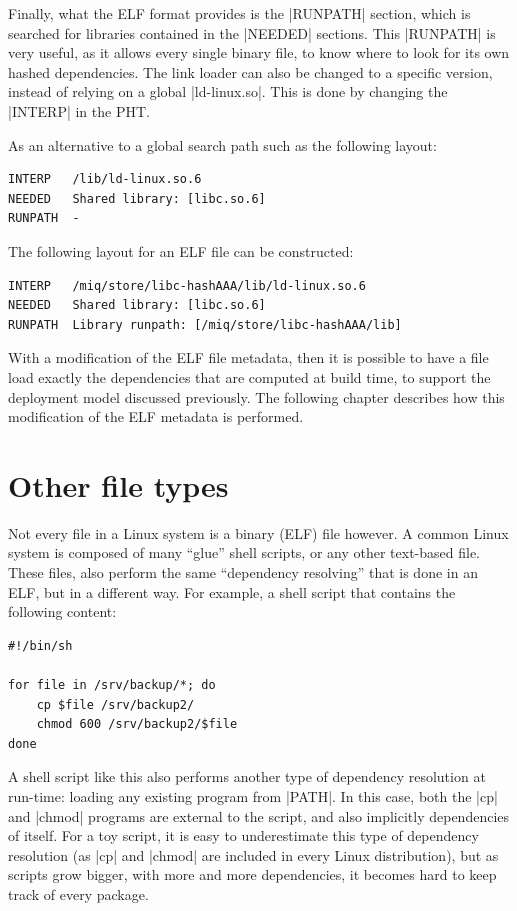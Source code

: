 Finally, what the ELF format provides is the |RUNPATH|
section, which is searched for libraries contained in the
|NEEDED| sections. This |RUNPATH| is very useful, as it
allows every single binary file, to know where to look for
its own hashed dependencies. The link loader can also be
changed to a specific version, instead of relying on a
global |ld-linux.so|. This is done by changing the
|INTERP| in the \ac{PHT}.


As an alternative to a global search path such as the
following layout:

\begin{verbatim}
INTERP   /lib/ld-linux.so.6
NEEDED   Shared library: [libc.so.6]
RUNPATH  -
\end{verbatim}

The following layout for an ELF file can be constructed:

\begin{verbatim}
INTERP   /miq/store/libc-hashAAA/lib/ld-linux.so.6
NEEDED   Shared library: [libc.so.6]
RUNPATH  Library runpath: [/miq/store/libc-hashAAA/lib]
\end{verbatim}

With a modification of the ELF file metadata, then it is
possible to have a file load exactly the dependencies that
are computed at build time, to support the deployment model
discussed previously. The following chapter describes how
this modification of the ELF metadata is performed.

\FloatBarrier
\section{Other file types}

Not every file in a Linux system is a binary (ELF) file
however. A common Linux system is composed of many ``glue''
shell scripts, or any other text-based file. These files,
also perform the same ``dependency resolving'' that is done
in an ELF, but in a different way. For example, a shell
script that contains the following content:

\begin{verbatim}
#!/bin/sh

for file in /srv/backup/*; do
    cp $file /srv/backup2/
    chmod 600 /srv/backup2/$file
done
\end{verbatim}

A shell script like this also performs another type of
dependency resolution at run-time: loading any existing
program from |PATH|. In this case, both the |cp| and |chmod|
programs are external to the script, and also implicitly
dependencies of itself. For a toy script, it is easy to
underestimate this type of dependency resolution (as |cp|
and |chmod| are included in every Linux distribution), but
as scripts grow bigger, with more and more dependencies, it
becomes hard to keep track of every package.

